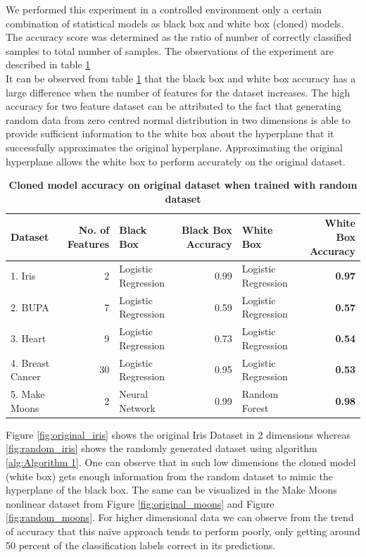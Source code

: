 \documentclass[9pt,twocolumn,twoside]{pnas-new}
\begin{document}
We performed this experiment in a controlled environment only a certain combination of statistical models as black box and white box (cloned) models. The accuracy score was determined as the ratio of number of correctly classified samples to total number of samples. The observations of the experiment are described in table \ref{table:1}\\
It can be observed from table \ref{table:1} that the black box and white box accuracy has a large difference when the number of features for the dataset increases. The high accuracy for two feature dataset can be attributed to the fact that generating random data from zero centred normal distribution in two dimensions is able to provide sufficient information to the white box about the hyperplane that it successfully approximates the original hyperplane. Approximating the original hyperplane allows the white box to perform accurately on the original dataset.\\

\begin{table}
  	\centering
  	\caption{\textbf{Cloned model accuracy on original dataset when trained with random dataset}}
	\begin{tabular}{lrlrlr}
		Dataset & No. of Features & Black Box & Black Box Accuracy & White Box & White Box Accuracy \\
	\midrule
		1. Iris & 2 & Logistic Regression & 0.99 & Logistic Regression & \textbf{0.97} \\
		2. BUPA & 7 & Logistic Regression & 0.59 & Logistic Regression & \textbf{0.57} \\
		3. Heart & 9 & Logistic Regression & 0.73 & Logistic Regression & \textbf{0.54} \\
		4. Breast Cancer & 30 & Logistic Regression & 0.95 & Logistic Regression & \textbf{0.53} \\
		5. Make Moons\footnotemark & 2 & Neural Network & 0.99 & Random Forest & \textbf{0.98} \\
	\bottomrule
	\end{tabular}
  	\label{table:1}
\end{table}

Figure \ref{fig:original_iris} shows the original Iris Dataset in 2 dimensions whereas \ref{fig:random_iris} shows the randomly generated dataset using algorithm \ref{alg:Algorithm 1}. One can observe that in such low dimensions the cloned model (white box) gets enough information from the random dataset to mimic the hyperplane of the black box. The same can be visualized in the Make Moons nonlinear dataset from Figure \ref{fig:original_moons} and Figure \ref{fig:random_moons}. For higher dimensional data we can observe from the trend of accuracy that this naïve approach tends to perform poorly, only getting around 50 percent of the classification labels correct in its predictions.
\end{document}
